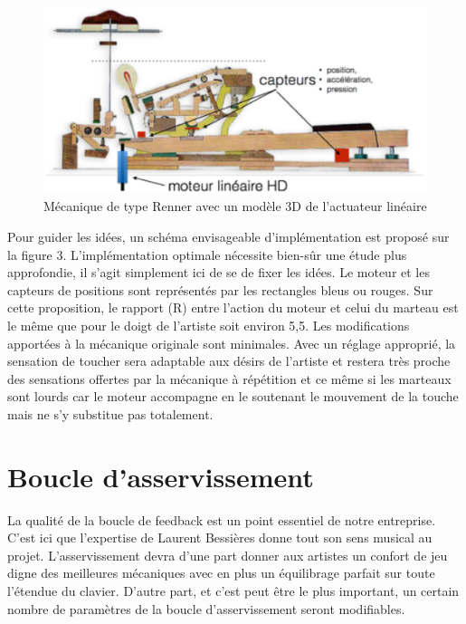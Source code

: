 \documentclass[french,a4paper,12pt]{report}
\begin{document}
	\begin{figure}[!ht]
    \center
   	\includegraphics[width=15cm]{MECA_PIANO3.png}
 		\caption{Mécanique de type Renner avec un modèle 3D de l’actuateur linéaire}
	\end{figure}


Pour guider les idées, un schéma envisageable d’implémentation est proposé sur la figure 3. L’implémentation optimale nécessite bien-sûr une étude plus approfondie, il s’agit simplement ici de se de fixer les idées. Le moteur et les capteurs de positions sont représentés par les rectangles bleus ou rouges. Sur cette proposition, le rapport (R) entre l’action du moteur et celui du marteau est le même que pour le doigt de l’artiste soit environ 5,5. Les modifications apportées à la mécanique originale sont minimales. Avec un réglage approprié, la sensation
de toucher sera adaptable aux désirs de l’artiste et restera très proche des sensations offertes par la mécanique à répétition et ce même si les marteaux sont lourds car le moteur accompagne en le soutenant le mouvement de la touche mais ne s’y substitue pas totalement.

  \section{Boucle d'asservissement}

La qualité de la boucle de feedback est un point essentiel de notre entreprise. C’est ici que l’expertise de Laurent Bessières donne tout son sens musical au projet. L’asservissement devra d’une part donner aux artistes un confort de jeu digne des meilleures mécaniques avec en plus un équilibrage parfait sur toute l’étendue du clavier. D’autre part, et c’est peut être le plus important, un certain nombre de paramètres de la boucle d’asservissement seront modifiables.
\end{document}
